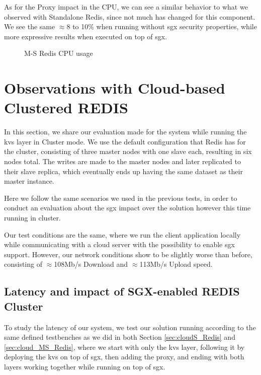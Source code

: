 As for the Proxy impact in the CPU, we can see a similar behavior to what we observed with Standalone Redis, since not much has changed for this component. We see the same $\approx$8 to 10\% when running without \gls{sgx} security properties, while more expressive results when executed on top of \gls{sgx}.

\begin{figure}[htbp]
	\centering
	\caption{M-S Redis CPU usage}
	\label{fig:cpuUsageMS}
\end{figure}

\section{Observations with Cloud-based Clustered REDIS}
In this section, we share our evaluation made for the system while running the \gls{kvs} layer in Cluster mode. We use the default configuration that Redis has for the cluster, consisting of three master nodes with one slave each, resulting in six nodes total. The writes are made to the master nodes and later replicated to their slave replica, which eventually ends up having the same dataset as their master instance. 

Here we follow the same scenarios we used in the previous tests, in order to conduct an evaluation about the \gls{sgx} impact over the solution however this time running in cluster.

Our test conditions are the same, where we run the client application locally while communicating with a cloud server with the possibility to enable \gls{sgx} support. However, our network conditions show to be slightly worse than before, consisting of $\approx$108Mb/s Download and $\approx$113Mb/s Upload speed.

\vspace{10mm}

\subsection{Latency and impact of SGX-enabled REDIS Cluster}

To study the latency of our system, we test our solution running according to the same defined testbenches as we did in both Section \ref{sec:cloudS_Redis} and \ref{sec:cloud_MS_Redis}, where we start with only the \gls{kvs} layer, following it by deploying the \gls{kvs} on top of \gls{sgx}, then adding the proxy, and ending with both layers working together while running on top of \gls{sgx}. 

